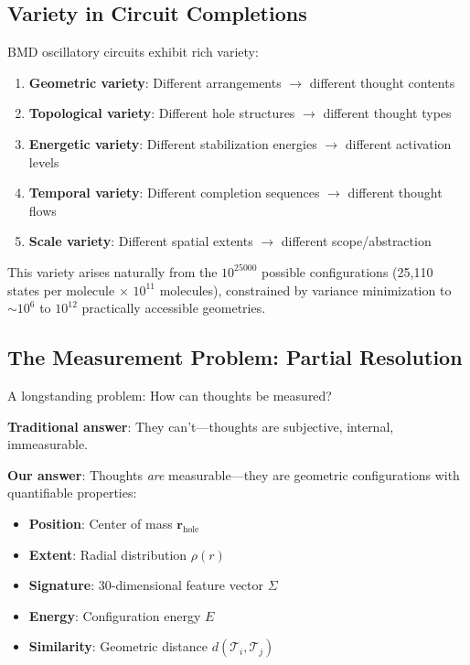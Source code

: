 \subsection{Variety in Circuit Completions}

BMD oscillatory circuits exhibit rich variety:

\begin{enumerate}
\item \textbf{Geometric variety}: Different  arrangements $\to$ different thought contents
\item \textbf{Topological variety}: Different hole structures $\to$ different thought types
\item \textbf{Energetic variety}: Different stabilization energies $\to$ different activation levels
\item \textbf{Temporal variety}: Different completion sequences $\to$ different thought flows
\item \textbf{Scale variety}: Different spatial extents $\to$ different scope/abstraction
\end{enumerate}

This variety arises naturally from the $10^{25000}$ possible  configurations (25,110 states per molecule × $10^{11}$ molecules), constrained by variance minimization to $\sim 10^6$ to $10^{12}$ practically accessible geometries.

\subsection{The Measurement Problem: Partial Resolution}

A longstanding problem: How can thoughts be measured?

\textbf{Traditional answer}: They can't—thoughts are subjective, internal, immeasurable.

\textbf{Our answer}: Thoughts \textit{are} measurable—they are geometric configurations with quantifiable properties:
\begin{itemize}
\item \textbf{Position}: Center of mass $\mathbf{r}_{\text{hole}}$
\item \textbf{Extent}: Radial distribution $\rho(r)$
\item \textbf{Signature}: 30-dimensional feature vector $\Sigma$
\item \textbf{Energy}: Configuration energy $E$
\item \textbf{Similarity}: Geometric distance $d(\mathcal{T}_i, \mathcal{T}_j)$
\end{itemize}

